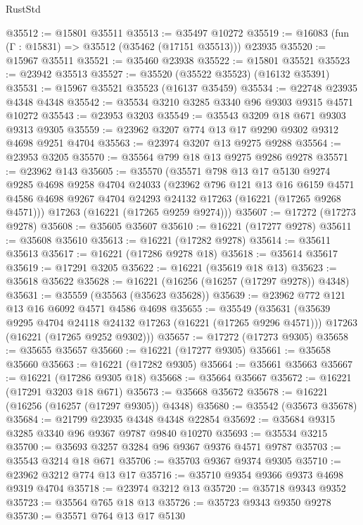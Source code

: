 \begin{lexlean}{RustStd}
\begin{coremodule}
@35512 := @15801 @35511
@35513 := @35497 @10272
@35519 := @16083 (fun (Γ : @15831) => @35512 (@35462 (@17151 @35513))) @23935
@35520 := @15967 @35511
@35521 := @35460 @23938
@35522 := @15801 @35521
@35523 := @23942 @35513
@35527 := @35520 (@35522 @35523) (@16132 @35391)
@35531 := @15967 @35521 @35523 (@16137 @35459)
@35534 := @22748 @23935 @4348 @4348
@35542 := @35534 @3210 @3285 @3340 @96 @9303 @9315 @4571 @10272
@35543 := @23953 @3203
@35549 := @35543 @3209 @18 @671 @9303 @9313 @9305
@35559 := @23962 @3207 @774 @13 @17 @9290 @9302 @9312 @4698 @9251 @4704
@35563 := @23974 @3207 @13 @9275 @9288
@35564 := @23953 @3205
@35570 := @35564 @799 @18 @13 @9275 @9286 @9278
@35571 := @23962 @143
@35605 := @35570
    (@35571
      @798
      @13
      @17
      @5130
      @9274
      @9285
      @4698
      @9258
      @4704
      @24033
      (@23962
        @796
        @121
        @13
        @16
        @6159
        @4571
        @4586
        @4698
        @9267
        @4704
        @24293
        @24132
        @17263
        (@16221 (@17265 @9268 @4571)))
      @17263
      (@16221 (@17265 @9259 @9274)))
@35607 := @17272 (@17273 @9278)
@35608 := @35605 @35607
@35610 := @16221 (@17277 @9278)
@35611 := @35608 @35610
@35613 := @16221 (@17282 @9278)
@35614 := @35611 @35613
@35617 := @16221 (@17286 @9278 @18)
@35618 := @35614 @35617
@35619 := @17291 @3205
@35622 := @16221 (@35619 @18 @13)
@35623 := @35618 @35622
@35628 := @16221 (@16256 (@16257 (@17297 @9278)) @4348)
@35631 := @35559 (@35563 (@35623 @35628))
@35639 := @23962 @772 @121 @13 @16 @6092 @4571 @4586 @4698
@35655 := @35549
    (@35631
      (@35639 @9295 @4704 @24118 @24132 @17263 (@16221 (@17265 @9296 @4571)))
      @17263
      (@16221 (@17265 @9252 @9302)))
@35657 := @17272 (@17273 @9305)
@35658 := @35655 @35657
@35660 := @16221 (@17277 @9305)
@35661 := @35658 @35660
@35663 := @16221 (@17282 @9305)
@35664 := @35661 @35663
@35667 := @16221 (@17286 @9305 @18)
@35668 := @35664 @35667
@35672 := @16221 (@17291 @3203 @18 @671)
@35673 := @35668 @35672
@35678 := @16221 (@16256 (@16257 (@17297 @9305)) @4348)
@35680 := @35542 (@35673 @35678)
@35684 := @21799 @23935 @4348 @4348 @22854
@35692 := @35684 @9315 @3285 @3340 @96 @9367 @9787 @9840 @10270
@35693 := @35534 @3215
@35700 := @35693 @3257 @3284 @96 @9367 @9376 @4571 @9787
@35703 := @35543 @3214 @18 @671
@35706 := @35703 @9367 @9374 @9305
@35710 := @23962 @3212 @774 @13 @17
@35716 := @35710 @9354 @9366 @9373 @4698 @9319 @4704
@35718 := @23974 @3212 @13
@35720 := @35718 @9343 @9352
@35723 := @35564 @765 @18 @13
@35726 := @35723 @9343 @9350 @9278
@35730 := @35571 @764 @13 @17 @5130

\end{coremodule}
\end{lexlean}
